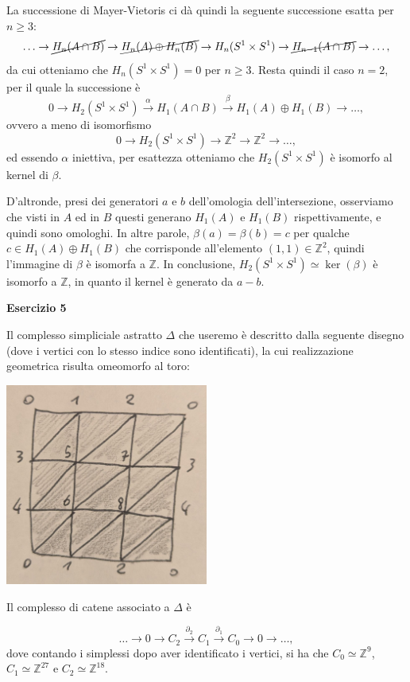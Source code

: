 \documentclass[a4paper]{article}
\newcommand{\Z}{\mathbb{Z}}
\theoremstyle{definition}
\theoremstyle{definition}
\theoremstyle{remark}
\theoremstyle{definition}
\begin{document}
La successione di Mayer-Vietoris ci dà quindi la seguente successione esatta per $n\geq 3$:
\[
    \ldots\to \cancel{H_n(A\cap B)} \to \cancel{H_n(A) \oplus H_n(B)} \to H_n(S^1\times S^1) \to \cancel{H_{n-1}(A\cap B)} \to \ldots,
\]
da cui otteniamo che $H_n(S^1\times S^1) = 0$ per $n\geq 3$.
Resta quindi il caso $n=2$, per il quale la successione è
\[
    0 \to H_2(S^1\times S^1) \overset{\alpha}{\to} H_1(A\cap B) \overset{\beta}{\to} H_1(A) \oplus H_1(B) \to \ldots,
\]
ovvero a meno di isomorfismo
\[
    0 \to H_2(S^1\times S^1) \to \Z^2 \to \Z^2 \to \ldots,
\]
ed essendo $\alpha$ iniettiva, per esattezza otteniamo che $H_2(S^1\times S^1)$ è isomorfo al kernel di $\beta$.

D'altronde, presi dei generatori $a$ e $b$ dell'omologia dell'intersezione, osserviamo che visti in $A$ ed in $B$ questi generano $H_1(A)$ e $H_1(B)$ rispettivamente, e quindi sono
omologhi. In altre parole, $\beta(a)=\beta(b) = c$ per qualche $c\in H_1(A)\oplus H_1(B)$ che corrisponde all'elemento $(1,1)\in \Z^2$, quindi l'immagine di $\beta$ è isomorfa a $\Z$.
In conclusione, $H_2(S^1\times S^1) \simeq \ker(\beta) $ è isomorfo a $\Z$, in quanto il kernel è generato da $a-b$.

\newpage
\textbf{Esercizio 5}

Il complesso simpliciale astratto $\Delta$ che useremo è descritto dalla seguente disegno (dove i vertici con lo stesso indice sono identificati), la cui realizzazione geometrica risulta omeomorfo al toro:

\begin{center}
    \includegraphics[width=0.5\textwidth]{toro.jpg}
\end{center}

Il complesso di catene associato a $\Delta$ è

\[
\ldots \to 0 \to C_2 \overset{\partial_2}{\to} C_1 \overset{\partial_1}{\to} C_0 \to 0 \to \ldots
,\]
dove contando i simplessi dopo aver identificato i vertici, si ha che $C_0 \simeq \Z^9$, $C_1 \simeq \Z^{27}$ e $C_2 \simeq \Z^{18}$.
\end{document}
